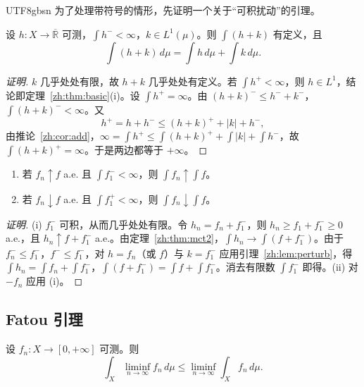 \documentclass[11pt]{article}
\makeatletter
\newcommand{\envlabel}[1]{\protected@edef\@currentlabel{\themathenv}\label{#1}}
\makeatother
\begin{document}
\begin{CJK*}{UTF8}{gbsn}
为了处理带符号的情形，先证明一个关于“可积扰动”的引理。

\begin{lemma}\envlabel{zh:lem:perturb}
设 $h:X\to\overline{\mathbb{R}}$ 可测，$\int h^{-}<\infty$，$k\in L^{1}(\mu)$。则 $\int(h+k)$ 有定义，且
\[
\int(h+k)\,d\mu=\int h\,d\mu+\int k\,d\mu.
\]
\end{lemma}

\begin{proof}[证明]
$k$ 几乎处处有限，故 $h+k$ 几乎处处有定义。若 $\int h^{+}<\infty$，则 $h\in L^{1}$，结论即定理~\ref{zh:thm:basic}(i)。设 $\int h^{+}=\infty$。由 $(h+k)^{-}\leq h^{-}+k^{-}$，$\int(h+k)^{-}<\infty$。又
\[
h^{+}=h+h^{-}\leq(h+k)^{+}+|k|+h^{-},
\]
由推论~\ref{zh:cor:add}，$\infty=\int h^{+}\leq\int(h+k)^{+}+\int|k|+\int h^{-}$，故 $\int(h+k)^{+}=\infty$。于是两边都等于 $+\infty$。
\end{proof}

\begin{corollary}[带可积下界的单调收敛定理]\envlabel{zh:cor:mctgen}
\leavevmode
\begin{enumerate}
  \item 若 $f_{n}\uparrow f$ a.e. 且 $\int f_{1}^{-}<\infty$，则 $\int f_{n}\uparrow\int f$。
  \item 若 $f_{n}\downarrow f$ a.e. 且 $\int f_{1}^{+}<\infty$，则 $\int f_{n}\downarrow\int f$。
\end{enumerate}
\end{corollary}

\begin{proof}[证明]
(i) $f_{1}^{-}$ 可积，从而几乎处处有限。令 $h_{n}=f_{n}+f_{1}^{-}$，则 $h_{n}\geq f_{1}+f_{1}^{-}\geq0$ a.e.，且 $h_{n}\uparrow f+f_{1}^{-}$ a.e.。由定理~\ref{zh:thm:mct2}，$\int h_{n}\to\int(f+f_{1}^{-})$。由于 $f_{n}^{-}\leq f_{1}^{-}$，$f^{-}\leq f_{1}^{-}$，对 $h=f_{n}$（或 $f$）与 $k=f_{1}^{-}$ 应用引理~\ref{zh:lem:perturb}，得 $\int h_{n}=\int f_{n}+\int f_{1}^{-}$，$\int(f+f_{1}^{-})=\int f+\int f_{1}^{-}$。消去有限数 $\int f_{1}^{-}$ 即得。(ii) 对 $-f_{n}$ 应用 (i)。
\end{proof}

\subsection{Fatou 引理}

\begin{theorem}[Fatou 引理]\envlabel{zh:thm:fatou}
设 $f_{n}:X\to[0,+\infty]$ 可测。则
\[
\int_{X}\liminf_{n\to\infty}f_{n}\,d\mu\leq\liminf_{n\to\infty}\int_{X}f_{n}\,d\mu.
\]
\end{theorem}


\end{CJK*}
\end{document}
